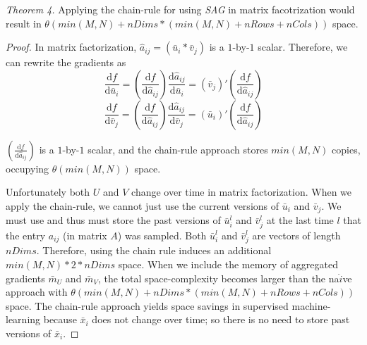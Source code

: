 \emph{Theorem 4.} 
Applying the chain-rule for using \emph{SAG} in matrix facotrization would result in $\theta(min(M,N) + nDims*(min(M,N)+nRows+nCols))$ space.
\begin{proof}
In matrix factorization, $\hat{a}_{ij} = \left(\bar{u}_{i}*\bar{v}_{j}\right)$ is a $1$-by-$1$ scalar.  
Therefore, we can rewrite the gradients as
\begin{equation}
\frac{\text{d}{f}}{\text{d}\bar{u}_{i}} = \left(\frac{\text{d}{f}}{\text{d}\hat{a}_{ij}}\right)\frac{\text{d}{\hat{a}_{ij}}}{\text{d}\bar{u}_{i}} = \left(\bar{v}_{j}\right)'\left(\frac{\text{d}{f}}{\text{d}\hat{a}_{ij}}\right)
\end{equation}
\begin{equation}
\frac{\text{d}{f}}{\text{d}\bar{v}_{j}} = \left(\frac{\text{d}{f}}{\text{d}\hat{a}_{ij}}\right)\frac{\text{d}{\hat{a}_{ij}}}{\text{d}\bar{v}_{j}} = \left(\bar{u}_{i}\right)'\left(\frac{\text{d}{f}}{\text{d}\hat{a}_{ij}}\right)
\end{equation}



$\left(\frac{\text{d}{f}}{\text{d}\hat{a}_{ij}}\right)$ is a $1$-by-$1$ scalar, and the chain-rule approach stores $min(M,N)$ copies, occupying $\theta(min(M,N))$ space.

Unfortunately both $U$ and $V$ change over time in matrix factorization.
When we apply the chain-rule, we cannot just use the current versions of $\bar{u}_{i}$ and $\bar{v}_{j}$.
We must use and thus must store the past versions of $\bar{u}_{i}^{l}$ and $\bar{v}_{j}^{l}$ at the last time $l$ that the entry $a_{ij}$ (in matrix $A$) was sampled.
Both $\bar{u}_{i}^{l}$ and $\bar{v}_{j}^{l}$ are vectors of length $nDims$.
Therefore, using the chain rule induces an additional $min(M,N)*2*nDims$ space.
When we include the memory of aggregated gradients $\bar{m}_{U}$ and $\bar{m}_{V}$, the total space-complexity becomes larger than the na$\ddot{i}$ve approach with $\theta(min(M,N) + nDims*(min(M,N)+nRows+nCols))$ space.
The chain-rule approach yields space savings in supervised machine-learning because $\bar{x}_{i}$ does not change over time; 
so there is no need to store past versions of $\bar{x}_{i}$.
\end{proof}
